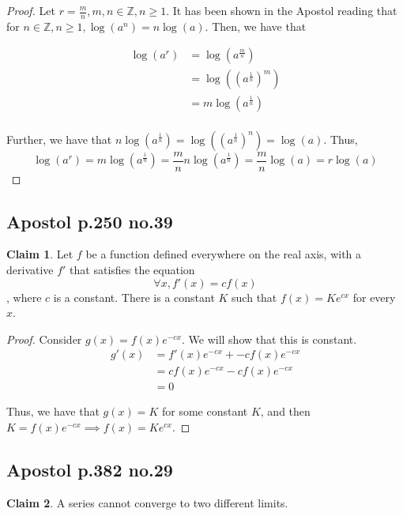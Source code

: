 \documentclass[12pt,letterpaper]{article}
\theoremstyle{definition}
\newtheorem*{claim}{Claim}
\newcommand{\Z}{\mathbb{Z}}
\begin{document}
\begin{proof}
  Let $r = \frac{m}{n}, m,n \in \Z, n \geq 1$. It has been shown in the Apostol reading
  that for $n \in \Z, n \geq 1, \log(a^n) = n\log(a)$. Then, we have that

  \begin{align*}
    \log(a^r) &= \log(a^{\frac{m}{n}}) \\
              &= \log((a^{\frac{1}{n}})^m) \\
              &= m\log(a^{\frac{1}{n}}) \\
  \end{align*}

  Further, we have that $n\log(a^{\frac{1}{n}}) = \log((a^{\frac{1}{n}})^n) = \log(a)$.
  Thus,
  \[
    \log(a^r) = m\log(a^{\frac{1}{n}}) = \frac{m}{n}n\log(a^{\frac{1}{n}}) =
    \frac{m}{n}\log(a) = r\log(a)
  \]
\end{proof}

\subsection*{Apostol p.250 no.39}

\begin{claim}
  Let $f$ be a function defined everywhere on the real axis, with a derivative
  $f'$ that satisfies the equation
  \[ \forall x, f'(x) = cf(x) \],
  where $c$ is a constant. There is a constant $K$ such that $f(x) = Ke^{cx}$
  for every $x$.
\end{claim}

\begin{proof}
  Consider $g(x) = f(x)e^{-cx}$. We will show that this is constant.
  \begin{align*}
    g'(x) &= f'(x)e^{-cx} + -cf(x)e^{-cx} \\
          &= cf(x)e^{-cx} - cf(x)e^{-cx} \\
          &= 0
  \end{align*}

  Thus, we have that $g(x) = K$ for some constant $K$, and then $K = f(x)e^{-cx}
  \implies f(x) = Ke^{cx}$.
\end{proof}

\subsection*{Apostol p.382 no.29}

\begin{claim}
  A series cannot converge to two different limits.
\end{claim}
\end{document}
